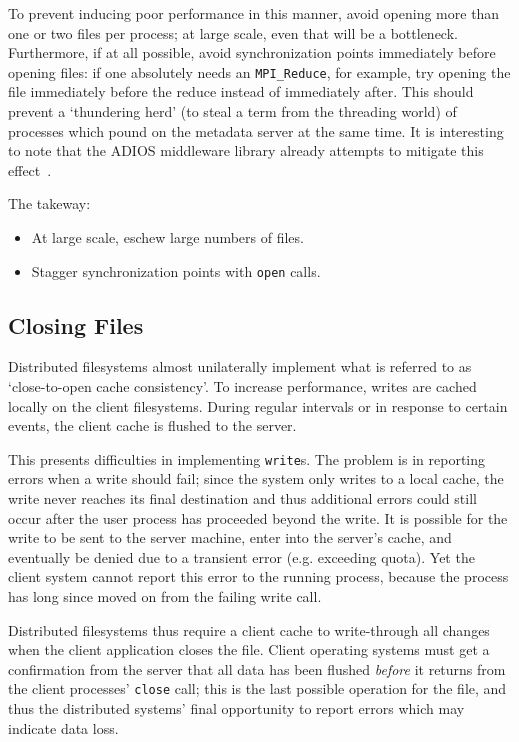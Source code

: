 To prevent inducing poor performance in this manner, avoid opening
more than one or two files per process; at large scale,
even that will be a bottleneck.  Furthermore, if at all possible,
avoid synchronization points immediately before opening files: if one
absolutely needs an \verb!MPI_Reduce!, for example, try opening the
file immediately before the reduce instead of immediately after.  This
should prevent a `thundering herd' (to steal a term from the threading
world) of processes which pound on the metadata server at the same
time.  It is interesting to note that the ADIOS middleware library
already attempts to mitigate this effect~\cite{ADIOS:Manual}.

The takeway:

\begin{itemize}
  \item At large scale, eschew large numbers of files.
  \item Stagger synchronization points with \verb!open! calls.
\end{itemize}

\subsection{Closing Files}

Distributed filesystems almost unilaterally implement what is referred
to as `close-to-open cache consistency'.  To increase performance,
writes are cached locally on the client filesystems.  During regular
intervals or in response to certain events, the client cache is flushed
to the server.

This presents difficulties in implementing \verb!write!s.  The problem
is in reporting errors when a write should fail; since the system only
writes to a local cache, the write never reaches its final destination
and thus additional errors could still occur after the user process has
proceeded beyond the write.  It is possible for the write to be sent to
the server machine, enter into the server's cache, and eventually be
denied due to a transient error (e.g. exceeding quota).  Yet the client
system cannot report this error to the running process, because the
process has long since moved on from the failing write call.

Distributed filesystems thus require a client cache to write-through
all changes when the client application closes the file.  Client
operating systems must get a confirmation from the server that all data
has been flushed
\emph{before} it returns from the client processes' \verb!close!
call; this is the last possible operation for the file, and thus the
distributed systems' final opportunity to report errors which may
indicate data loss.

